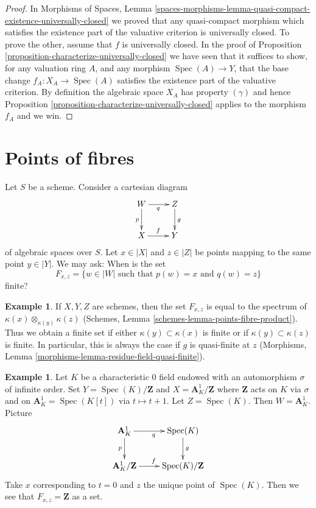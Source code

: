 \documentclass{stacks-project}
\theoremstyle{plain}
\theoremstyle{definition}
\newtheorem{example}[subsection]{Example}
\theoremstyle{remark}
\numberwithin{equation}{subsection}
\def\Spec{\mathop{\mathrm{Spec}}}
\begin{document}
\begin{proof}
In
Morphisms of Spaces,
Lemma \ref{spaces-morphisms-lemma-quasi-compact-existence-universally-closed}
we proved that any quasi-compact morphism which satisfies the existence
part of the valuative criterion is universally closed.
To prove the other, assume that $f$ is universally closed.
In the proof of
Proposition \ref{proposition-characterize-universally-closed}
we have seen that it suffices to show, for any valuation ring $A$,
and any morphism $\Spec(A) \to Y$, that the base change
$f_A : X_A \to \Spec(A)$ satisfies the existence part of the valuative
criterion. By definition the algebraic space $X_A$ has property $(\gamma)$
and hence
Proposition \ref{proposition-characterize-universally-closed}
applies to the morphism $f_A$ and we win.
\end{proof}





\section{Points of fibres}
\label{section-points-fibres}

\noindent
Let $S$ be a scheme. Consider a cartesian diagram
\begin{equation}
\label{equation-points-fibres}
\xymatrix{
W \ar[r]_q \ar[d]_p & Z \ar[d]^g \\
X \ar[r]^f & Y
}
\end{equation}
of algebraic spaces over $S$. Let $x \in |X|$ and $z \in |Z|$
be points mapping to the same point $y \in |Y|$. We may ask:
When is the set
\begin{equation}
\label{equation-fibre}
F_{x, z} = \{ w \in |W| \text{ such that }p(w) = x\text{ and }q(w) = z\}
\end{equation}
finite?

\begin{example}
\label{example-schemes}
If $X, Y, Z$ are schemes, then the set $F_{x, z}$
is equal to the spectrum of $\kappa(x) \otimes_{\kappa(y)} \kappa(z)$
(Schemes, Lemma \ref{schemes-lemma-points-fibre-product}). Thus we
obtain a finite set if either $\kappa(y) \subset \kappa(x)$ is finite or if
$\kappa(y) \subset \kappa(z)$ is finite. In particular, this is always
the case if $g$ is quasi-finite at $z$ (Morphisms, Lemma
\ref{morphisms-lemma-residue-field-quasi-finite}).
\end{example}

\begin{example}
\label{example-not-finite}
Let $K$ be a characteristic $0$ field endowed with an automorphism
$\sigma$ of infinite order. Set $Y = \Spec(K)/\mathbf{Z}$ and
$X = \mathbf{A}^1_K/\mathbf{Z}$ where $\mathbf{Z}$ acts on $K$ via $\sigma$
and on $\mathbf{A}^1_K = \Spec(K[t])$ via $t \mapsto t + 1$.
Let $Z = \Spec(K)$. Then $W = \mathbf{A}^1_K$. Picture
$$
\xymatrix{
\mathbf{A}^1_K \ar[r]_q \ar[d]_p & \Spec(K) \ar[d]^g \\
\mathbf{A}^1_K/\mathbf{Z} \ar[r]^f & \Spec(K)/\mathbf{Z}
}
$$
Take $x$ corresponding to $t = 0$ and $z$ the unique point of $\Spec(K)$.
Then we see that $F_{x, z} = \mathbf{Z}$ as a set.
\end{example}
\end{document}
